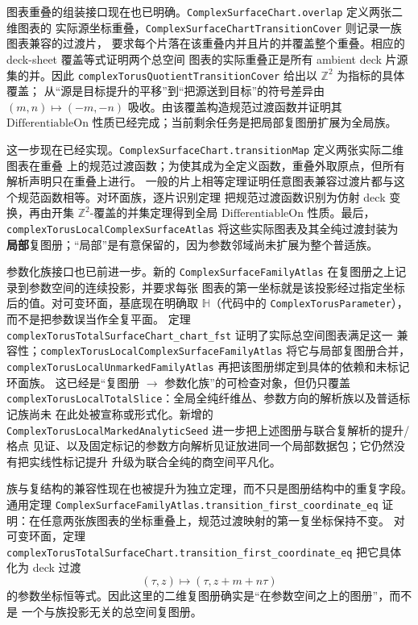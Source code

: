 \documentclass[UTF8,fontset=none,a4paper,11pt]{ctexart}
\begin{document}
图表重叠的组装接口现在也已明确。\texttt{ComplexSurfaceChart.overlap} 定义两张二维图表的
实际源坐标重叠，\texttt{ComplexSurfaceChartTransitionCover} 则记录一族图表兼容的过渡片，
要求每个片落在该重叠内并且片的并覆盖整个重叠。相应的 deck-sheet 覆盖等式证明两个总空间
图表的实际重叠正是所有 ambient deck 片源集的并。因此
\texttt{complexTorusQuotientTransitionCover} 给出以 \(\mathbb Z^2\) 为指标的具体覆盖；
从“源是目标提升的平移”到“把源送到目标”的符号差异由
\((m,n)\mapsto(-m,-n)\) 吸收。由该覆盖构造规范过渡函数并证明其
\(\mathrm{DifferentiableOn}\) 性质已经完成；当前剩余任务是把局部复图册扩展为全局族。

这一步现在已经实现。\texttt{ComplexSurfaceChart.transitionMap} 定义两张实际二维图表在重叠
上的规范过渡函数；为使其成为全定义函数，重叠外取原点，但所有解析声明只在重叠上进行。
一般的片上相等定理证明任意图表兼容过渡片都与这个规范函数相等。对环面族，逐片识别定理
把规范过渡函数识别为仿射 deck 变换，再由开集 \(\mathbb Z^2\)-覆盖的并集定理得到全局
\(\mathrm{DifferentiableOn}\) 性质。最后，
\texttt{complexTorusLocalComplexSurfaceAtlas} 将这些实际图表及其全纯过渡封装为
\textbf{局部}复图册；“局部”是有意保留的，因为参数邻域尚未扩展为整个普适族。

参数化族接口也已前进一步。新的
\texttt{ComplexSurfaceFamilyAtlas} 在复图册之上记录到参数空间的连续投影，并要求每张
图表的第一坐标就是该投影经过指定坐标后的值。对可变环面，基底现在明确取
\(\mathbb H\)（代码中的 \texttt{ComplexTorusParameter}），而不是把参数误当作全复平面。
定理 \texttt{complexTorusTotalSurfaceChart\_chart\_fst} 证明了实际总空间图表满足这一
兼容性；\texttt{complexTorusLocalComplexSurfaceFamilyAtlas} 将它与局部复图册合并，
\texttt{complexTorusLocalUnmarkedFamilyAtlas} 再把该图册绑定到具体的依赖和未标记环面族。
这已经是“复图册 \(\to\) 参数化族”的可检查对象，但仍只覆盖
\texttt{complexTorusLocalTotalSlice}：全局全纯纤维丛、参数方向的解析族以及普适标记族尚未
在此处被宣称或形式化。新增的
\texttt{ComplexTorusLocalMarkedAnalyticSeed} 进一步把上述图册与联合复解析的提升/格点
见证、以及固定标记的参数方向解析见证放进同一个局部数据包；它仍然没有把实线性标记提升
升级为联合全纯的商空间平凡化。

族与复结构的兼容性现在也被提升为独立定理，而不只是图册结构中的重复字段。
通用定理
\texttt{ComplexSurfaceFamilyAtlas.\allowbreak transition\_first\_coordinate\_eq}
证明：在任意两张族图表的坐标重叠上，规范过渡映射的第一复坐标保持不变。
对可变环面，定理
\texttt{complexTorusTotalSurfaceChart.\allowbreak transition\_first\_coordinate\_eq}
把它具体化为 deck 过渡
\[
  (\tau,z)\longmapsto(\tau,z+m+n\tau)
\]
的参数坐标恒等式。因此这里的二维复图册确实是“在参数空间之上的图册”，而不是
一个与族投影无关的总空间复图册。
\end{document}
